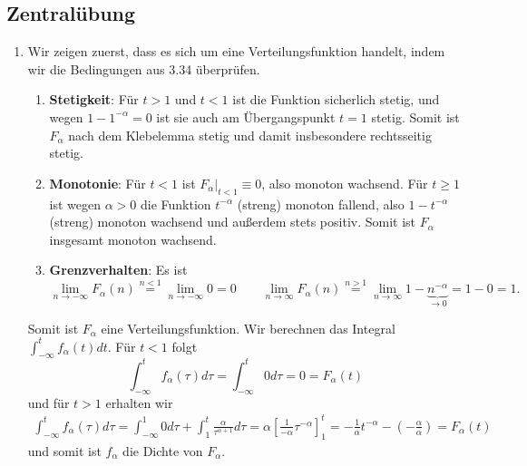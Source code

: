\documentclass[a4paper]{article}
\begin{document}
\makeexheader

\subsection{Zentralübung}

\begin{enumerate}[label=(\alph*)]
	\item Wir zeigen zuerst, dass es sich um eine Verteilungsfunktion handelt, indem wir die Bedingungen aus 3.34 überprüfen.
	      \begin{enumerate}
		      \item \textbf{Stetigkeit}: Für $t > 1$ und $t < 1$ ist die Funktion sicherlich stetig, und wegen $1 - 1^{-\alpha}=0$ ist sie auch am Übergangspunkt $t = 1$ stetig. Somit ist $F_\alpha$ nach dem Klebelemma stetig und damit insbesondere rechtsseitig stetig.
		      \item \textbf{Monotonie}: Für $t < 1$ ist $F_\alpha|_{t < 1} \equiv 0$, also monoton wachsend. Für $t \geq 1$ ist wegen $\alpha > 0$ die Funktion $t^{-\alpha}$ (streng) monoton fallend, also $1 - t^{-\alpha}$ (streng) monoton wachsend und außerdem stets positiv. Somit ist $F_\alpha$ insgesamt monoton wachsend.
		      \item \textbf{Grenzverhalten}: Es ist
		            \begin{equation*}
			            \lim_{n \to -\infty} F_\alpha(n) \overset{n < 1}{=} \lim_{n \to -\infty} 0 = 0 \qquad \lim_{n \to \infty} F_\alpha(n) \overset{n > 1}{=} \lim_{n \to \infty} 1 - \underbrace{n^{-\alpha}}_{\to 0} = 1 - 0 = 1\text{.}
		            \end{equation*}
	      \end{enumerate}
	      Somit ist $F_\alpha$ eine Verteilungsfunktion. Wir berechnen das Integral $\int_{-\infty}^{t} f_\alpha(t) dt$. Für $t < 1$ folgt
	      \begin{equation*}
		      \int_{-\infty}^{t} f_\alpha(\tau) d\tau = \int_{-\infty}^{t} 0 d\tau = 0 = F_\alpha(t)
	      \end{equation*}
	      und für $t > 1$ erhalten wir
	      \begin{align*}
		      \int_{-\infty}^{t} f_\alpha(\tau) d\tau = \int_{-\infty}^{1} 0 d\tau + \int_{1}^{t} \frac{\alpha}{\tau^{\alpha + 1}} d\tau = \alpha \left[\frac{1}{-\alpha} \tau^{-\alpha}\right]_1^t = - \frac{1}{\alpha} t^{-\alpha} - \left( - \frac{\alpha}{\alpha} \right) = F_\alpha(t)
	      \end{align*}
	      und somit ist $f_\alpha$ die Dichte von $F_\alpha$.

\end{enumerate}
\end{document}

